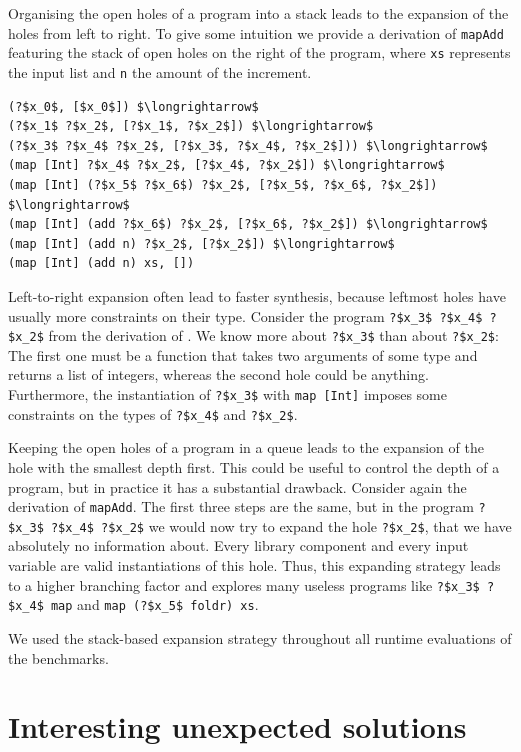 Organising the open holes of a program into a stack leads to the expansion of the holes from left to right. To give some intuition we provide a derivation of \lstinline?mapAdd? featuring the stack of open holes on the right of the program, where \lstinline?xs? represents the input list and \lstinline?n? the amount of the increment.
\begin{lstlisting}[style=plain]
(?$x_0$, [$x_0$]) $\longrightarrow$
(?$x_1$ ?$x_2$, [?$x_1$, ?$x_2$]) $\longrightarrow$
(?$x_3$ ?$x_4$ ?$x_2$, [?$x_3$, ?$x_4$, ?$x_2$])) $\longrightarrow$
(map [Int] ?$x_4$ ?$x_2$, [?$x_4$, ?$x_2$]) $\longrightarrow$
(map [Int] (?$x_5$ ?$x_6$) ?$x_2$, [?$x_5$, ?$x_6$, ?$x_2$]) $\longrightarrow$
(map [Int] (add ?$x_6$) ?$x_2$, [?$x_6$, ?$x_2$]) $\longrightarrow$
(map [Int] (add n) ?$x_2$, [?$x_2$]) $\longrightarrow$
(map [Int] (add n) xs, [])
\end{lstlisting}
Left-to-right expansion often lead to faster synthesis, because leftmost holes have usually more constraints on their type. Consider the program \lstinline!?$x_3$ ?$x_4$ ?$x_2$! from the derivation of \lstinline??. We know more about \lstinline!?$x_3$! than about \lstinline!?$x_2$!: The first one must be a function that takes two arguments of some type and returns a list of integers, whereas the second hole could be anything. Furthermore, the instantiation of \lstinline!?$x_3$! with \lstinline?map [Int]? imposes some constraints on the types of \lstinline!?$x_4$! and \lstinline!?$x_2$!.

Keeping the open holes of a program in a queue leads to the expansion of the hole with the smallest depth first. This could be useful to control the depth of a program, but in practice it has a substantial drawback. Consider again the derivation of \lstinline?mapAdd?. The first three steps are the same, but in the program \lstinline!?$x_3$ ?$x_4$ ?$x_2$! we would now try to expand the hole \lstinline!?$x_2$!, that we have absolutely no information about. Every library component and every input variable are valid instantiations of this hole. Thus, this expanding strategy leads to a higher branching factor and explores many useless programs like \lstinline!?$x_3$ ?$x_4$ map! and \lstinline!map (?$x_5$ foldr) xs!.

We used the stack-based expansion strategy throughout all runtime evaluations of the benchmarks.

\section{Interesting unexpected solutions}

